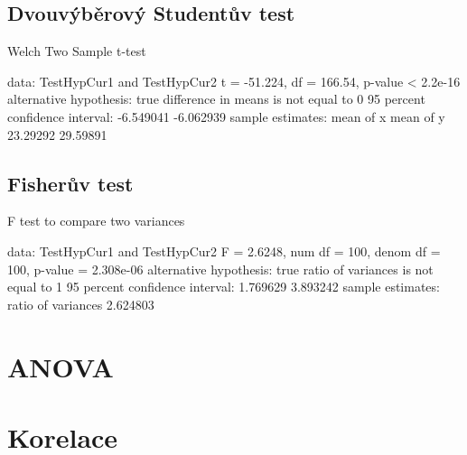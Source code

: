 \documentclass[a4paper]{ article}
\begin{document}
\subsection{Dvouvýběrový Studentův test}
\begin{Schunk}
\begin{Soutput}
	Welch Two Sample t-test

data:  TestHypCur1 and TestHypCur2
t = -51.224, df = 166.54, p-value < 2.2e-16
alternative hypothesis: true difference in means is not equal to 0
95 percent confidence interval:
 -6.549041 -6.062939
sample estimates:
mean of x mean of y 
 23.29292  29.59891 
\end{Soutput}
\end{Schunk}
\subsection{Fisherův test}
\begin{Schunk}
\begin{Soutput}
	F test to compare two variances

data:  TestHypCur1 and TestHypCur2
F = 2.6248, num df = 100, denom df = 100, p-value = 2.308e-06
alternative hypothesis: true ratio of variances is not equal to 1
95 percent confidence interval:
 1.769629 3.893242
sample estimates:
ratio of variances 
          2.624803 
\end{Soutput}
\end{Schunk}

\section{ANOVA}

\section{Korelace}
\end{document}
